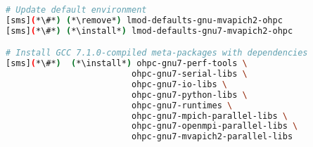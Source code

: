 \begin{lstlisting}[language=bash,keywords={}]
# Update default environment
[sms](*\#*) (*\remove*) lmod-defaults-gnu-mvapich2-ohpc
[sms](*\#*) (*\install*) lmod-defaults-gnu7-mvapich2-ohpc

# Install GCC 7.1.0-compiled meta-packages with dependencies
[sms](*\#*)  (*\install*) ohpc-gnu7-perf-tools \
                         ohpc-gnu7-serial-libs \
                         ohpc-gnu7-io-libs \
                         ohpc-gnu7-python-libs \
                         ohpc-gnu7-runtimes \
                         ohpc-gnu7-mpich-parallel-libs \
                         ohpc-gnu7-openmpi-parallel-libs \
                         ohpc-gnu7-mvapich2-parallel-libs
\end{lstlisting}


